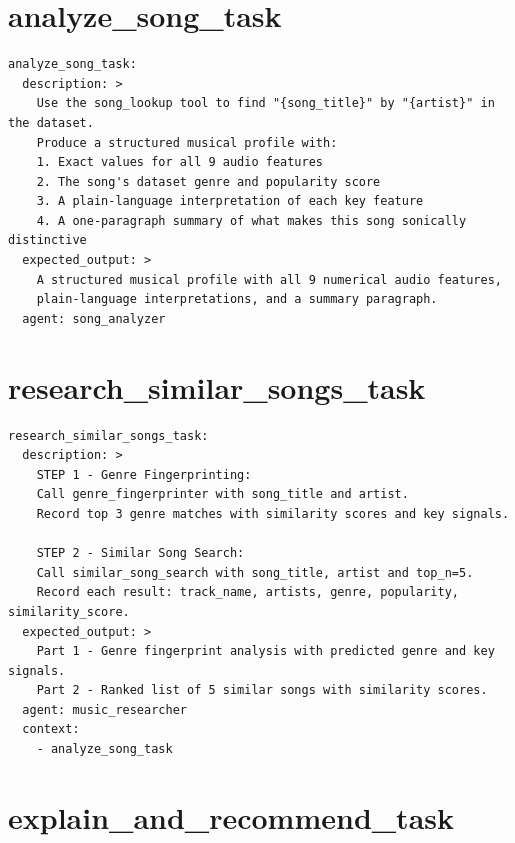 \documentclass[12pt,a4paper]{report}
\begin{document}
\section{analyze\_song\_task}

\begin{lstlisting}[style=yaml, caption={Definiția task-ului analyze\_song\_task}]
analyze_song_task:
  description: >
    Use the song_lookup tool to find "{song_title}" by "{artist}" in the dataset.
    Produce a structured musical profile with:
    1. Exact values for all 9 audio features
    2. The song's dataset genre and popularity score
    3. A plain-language interpretation of each key feature
    4. A one-paragraph summary of what makes this song sonically distinctive
  expected_output: >
    A structured musical profile with all 9 numerical audio features,
    plain-language interpretations, and a summary paragraph.
  agent: song_analyzer
\end{lstlisting}

\section{research\_similar\_songs\_task}

\begin{lstlisting}[style=yaml, caption={Definiția task-ului research\_similar\_songs\_task}]
research_similar_songs_task:
  description: >
    STEP 1 - Genre Fingerprinting:
    Call genre_fingerprinter with song_title and artist.
    Record top 3 genre matches with similarity scores and key signals.

    STEP 2 - Similar Song Search:
    Call similar_song_search with song_title, artist and top_n=5.
    Record each result: track_name, artists, genre, popularity, similarity_score.
  expected_output: >
    Part 1 - Genre fingerprint analysis with predicted genre and key signals.
    Part 2 - Ranked list of 5 similar songs with similarity scores.
  agent: music_researcher
  context:
    - analyze_song_task
\end{lstlisting}

\section{explain\_and\_recommend\_task}
\end{document}
